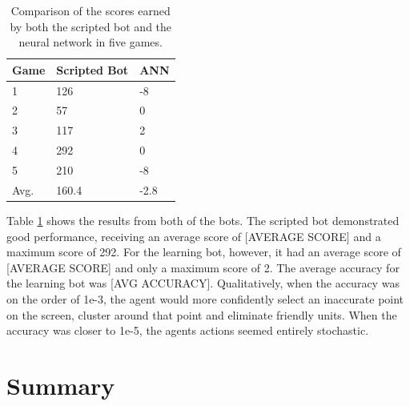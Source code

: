 \documentclass{amsart}
\theoremstyle{definition}
\begin{document}

\begin{table}[]
\caption{Comparison of the scores earned by both the scripted bot and the neural network in five games.}
\label{tab:scores}
\begin{tabular}{|l|l|l|}
\hline
Game & Scripted Bot & ANN  \\ \hline
1    & 126          & -8   \\ \hline
2    & 57           & 0    \\ \hline
3    & 117          & 2    \\ \hline
4    & 292          & 0    \\ \hline
5    & 210          & -8   \\ \hline
Avg. & 160.4        & -2.8 \\ \hline
\end{tabular}
\end{table}


Table \ref{tab:scores} shows the results from both of the bots.
The scripted bot demonstrated good performance, receiving an average score of [AVERAGE SCORE] and a maximum score of 292.
For the learning bot, however, it had an average score of [AVERAGE SCORE] and only a maximum score of 2.
The average accuracy for the learning bot was [AVG ACCURACY].
Qualitatively, when the accuracy was on the order of 1e-3, the agent would more confidently select an inaccurate point on the screen, cluster around that point and eliminate friendly units.
When the accuracy was closer to 1e-5, the agents actions seemed entirely stochastic.









\section{Summary}
\end{document}
